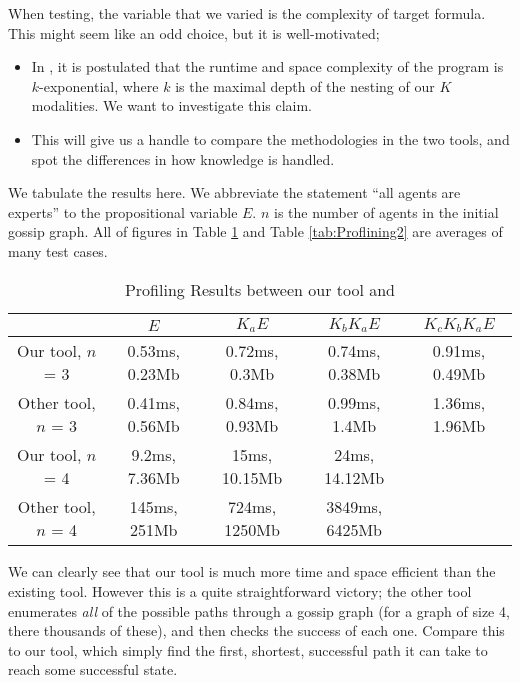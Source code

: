 \documentclass[10pt, a4paper]{report}
\begin{document}
When testing, the variable that we varied is the complexity of target formula.
This might seem like an odd choice, but it is well-motivated;

\begin{itemize}
\item In \cite{AutomataTechniques}, it is postulated that the runtime and space
  complexity of the program is $k$-exponential, where $k$ is the maximal depth
  of the nesting of our $K$ modalities. We want to investigate this claim.
\item This will give us a handle to compare the methodologies in the two tools,
  and spot the differences in how knowledge is handled.
\end{itemize}

We tabulate the results here. We abbreviate the statement ``all agents are
experts'' to the propositional variable $E$. $n$ is the number of agents in the
initial gossip graph. All of figures in Table \ref{tab:Proflining1} and Table
\ref{tab:Proflining2} are averages of many test cases. 

\begin{table}[h]
  \centering
  \begin{tabular}{|c||c|c|c|c|}
    \hline
    & $E$ & $ K_a E$ & $K_b K_a E$ & $K_c K_b K_a E$ \\ \hline 
    Our tool, $n$ = 3 & 0.53ms, 0.23Mb & 0.72ms, 0.3Mb & 0.74ms, 0.38Mb & 0.91ms, 0.49Mb \\ \hline
    Other tool, $n$ = 3 & 0.41ms, 0.56Mb & 0.84ms, 0.93Mb & 0.99ms, 1.4Mb & 1.36ms, 1.96Mb \\ \hline \hline
    Our tool, $n$ = 4   & 9.2ms, 7.36Mb & 15ms, 10.15Mb & 24ms, 14.12Mb & \\ \hline
    Other tool, $n$ = 4 & 145ms, 251Mb & 724ms, 1250Mb & 3849ms, 6425Mb & \\ 
    \hline
  \end{tabular}
  \caption{Profiling Results between our tool and \cite{GithubGossip}}
  \label{tab:Proflining1}
\end{table}

We can clearly see that our tool is much more time and space efficient than the
existing tool. However this is a quite straightforward victory; the other tool
enumerates \emph{all} of the possible paths through a gossip graph (for a
graph of size 4, there thousands of these), and then checks the success of each
one. Compare this to our tool, which simply find the first, shortest, successful
path it can take to reach some successful state.
\end{document}
